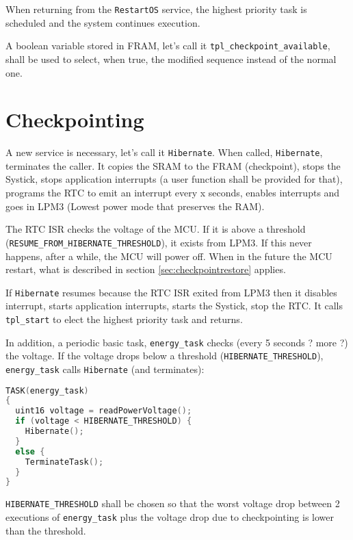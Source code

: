 \documentclass[11pt, oneside]{article}   	%
\begin{document}
When returning from the \lstinline{RestartOS} service, the highest priority task is scheduled and the system continues execution.

A boolean variable stored in FRAM, let's call it \lstinline{tpl_checkpoint_available}, shall be used to select, when true, the modified sequence instead of the normal one.

\section{Checkpointing}\label{sec:checkpointing}

A new service is necessary, let's call it \lstinline{Hibernate}. When called, \lstinline{Hibernate}, terminates the caller. It copies the SRAM to the FRAM (checkpoint), stops the Systick, stops application interrupts (a user function shall be provided for that), programs the RTC to emit an interrupt every x seconds, enables interrupts and goes in LPM3 (Lowest power mode that preserves the RAM).

The RTC ISR checks the voltage of the MCU. If it is above a threshold (\lstinline{RESUME_FROM_}\-\lstinline{HIBERNATE_THRESHOLD}), it exists from LPM3. If this never happens, after a while, the MCU will power off. When in the future the MCU restart, what is described in section \ref{sec:checkpointrestore} applies.  

If \lstinline{Hibernate} resumes because the RTC ISR exited from LPM3 then it disables interrupt, starts application interrupts, starts the Systick, stop the RTC. It calls \lstinline{tpl_start} to elect the highest priority task and returns.

In addition, a periodic basic task, \lstinline{energy_task} checks (every 5 seconds ? more ?) the voltage. If the voltage drops below a threshold (\lstinline{HIBERNATE_THRESHOLD}), \lstinline{energy_task} calls \lstinline{Hibernate} (and terminates):

\begin{lstlisting}[language=C]
TASK(energy_task)
{
  uint16 voltage = readPowerVoltage();
  if (voltage < HIBERNATE_THRESHOLD) {
    Hibernate();
  }
  else {
    TerminateTask();
  }
}
\end{lstlisting}

\lstinline{HIBERNATE_THRESHOLD} shall be chosen so that the worst voltage drop between 2 executions of \lstinline{energy_task} plus the voltage drop due to checkpointing is lower than the threshold.
\end{document}
